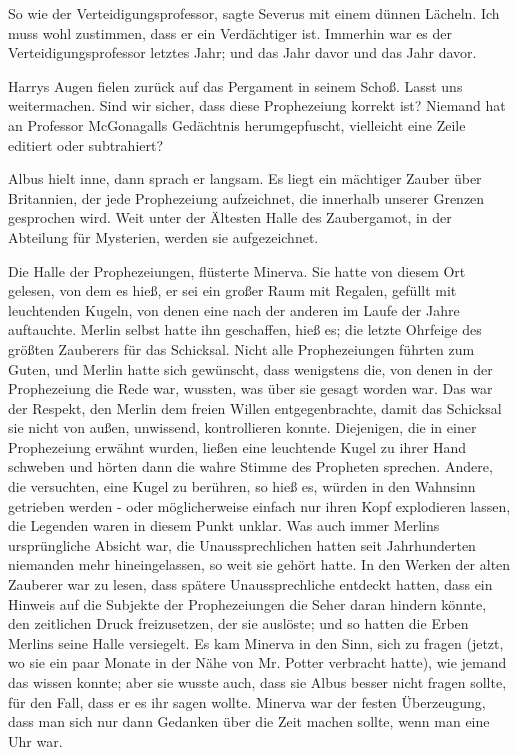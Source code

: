 \glqq So wie der Verteidigungsprofessor\grqq{}, sagte Severus mit einem dünnen
Lächeln. \glqq Ich muss wohl zustimmen, dass er ein Verdächtiger ist. Immerhin
war es der Verteidigungsprofessor letztes Jahr; und das Jahr davor und das Jahr
davor.\grqq{}

Harrys Augen fielen zurück auf das Pergament in seinem Schoß. \glqq Lasst uns
weitermachen. Sind wir sicher, dass diese Prophezeiung korrekt ist? Niemand hat
an Professor McGonagalls Gedächtnis herumgepfuscht, vielleicht eine Zeile
editiert oder subtrahiert?\grqq{}

Albus hielt inne, dann sprach er langsam. \glqq Es liegt ein mächtiger Zauber
über Britannien, der jede Prophezeiung aufzeichnet, die innerhalb unserer
Grenzen gesprochen wird. Weit unter der Ältesten Halle des Zaubergamot, in der
Abteilung für Mysterien, werden sie aufgezeichnet.\grqq{}

\glqq Die Halle der Prophezeiungen\grqq{}, flüsterte Minerva. Sie hatte von
diesem Ort gelesen, von dem es hieß, er sei ein großer Raum mit Regalen, gefüllt
mit leuchtenden Kugeln, von denen eine nach der anderen im Laufe der Jahre
auftauchte. Merlin selbst hatte ihn geschaffen, hieß es; die letzte Ohrfeige des
größten Zauberers für das Schicksal. Nicht alle Prophezeiungen führten zum
Guten, und Merlin hatte sich gewünscht, dass wenigstens die, von denen in der
Prophezeiung die Rede war, wussten, was über sie gesagt worden war. Das war der
Respekt, den Merlin dem freien Willen entgegenbrachte, damit das Schicksal sie
nicht von außen, unwissend, kontrollieren konnte. Diejenigen, die in einer
Prophezeiung erwähnt wurden, ließen eine leuchtende Kugel zu ihrer Hand schweben
und hörten dann die wahre Stimme des Propheten sprechen. Andere, die versuchten,
eine Kugel zu berühren, so hieß es, würden in den Wahnsinn getrieben werden -
oder möglicherweise einfach nur ihren Kopf explodieren lassen, die Legenden
waren in diesem Punkt unklar. Was auch immer Merlins ursprüngliche Absicht war,
die Unaussprechlichen hatten seit Jahrhunderten niemanden mehr hineingelassen,
so weit sie gehört hatte. In den Werken der alten Zauberer war zu lesen, dass
spätere Unaussprechliche entdeckt hatten, dass ein Hinweis auf die Subjekte der
Prophezeiungen die Seher daran hindern könnte, den zeitlichen Druck
freizusetzen, der sie auslöste; und so hatten die Erben Merlins seine Halle
versiegelt. Es kam Minerva in den Sinn, sich zu fragen (jetzt, wo sie ein paar
Monate in der Nähe von Mr. Potter verbracht hatte), wie jemand das wissen
konnte; aber sie wusste auch, dass sie Albus besser nicht fragen sollte, für den
Fall, dass er es ihr sagen wollte. Minerva war der festen Überzeugung, dass man
sich nur dann Gedanken über die Zeit machen sollte, wenn man eine Uhr war.

